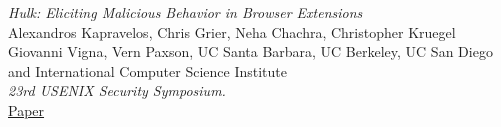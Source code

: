\documentclass[12pt]{article}
\begin{document}
\begin{multicols}{2}
\begin{thebibliography}{2}
\emph{Hulk: Eliciting Malicious Behavior in Browser Extensions}\\
Alexandros Kapravelos, Chris Grier, Neha Chachra, Christopher Kruegel
Giovanni Vigna, Vern Paxson,
UC Santa Barbara,
UC Berkeley, 
UC San Diego and 
International Computer Science Institute\\
\emph{23rd USENIX Security Symposium.}\\
\href{https://www.usenix.org/system/files/conference/usenixsecurity14/sec14-paper-kapravelos.pdf}{Paper}\\	
\end{thebibliography}
\end{multicols}
 
\end{document}
